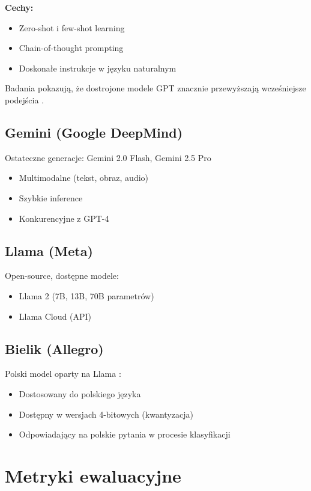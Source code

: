 \documentclass[11pt]{extreport}
\begin{document}
\textbf{Cechy:}
\begin{itemize}
    \item Zero-shot i few-shot learning
    \item Chain-of-thought prompting
    \item Doskonałe instrukcje w języku naturalnym
\end{itemize}

Badania pokazują, że dostrojone modele GPT znacznie przewyższają wcześniejsze podejścia \cite{openai2024gpt4}.

\subsection{Gemini (Google DeepMind)}

Ostateczne generacje: Gemini 2.0 Flash, Gemini 2.5 Pro
\begin{itemize}
    \item Multimodalne (tekst, obraz, audio)
    \item Szybkie inference
    \item Konkurencyjne z GPT-4
\end{itemize}

\subsection{Llama (Meta)}

Open-source, dostępne modele:
\begin{itemize}
    \item Llama 2 (7B, 13B, 70B parametrów)
    \item Llama Cloud (API) \cite{touvron2023llama}
\end{itemize}

\subsection{Bielik (Allegro)}

Polski model oparty na Llama \cite{bielik2024}:
\begin{itemize}
    \item Dostosowany do polskiego języka
    \item Dostępny w wersjach 4-bitowych (kwantyzacja)
    \item Odpowiadający na polskie pytania w procesie klasyfikacji
\end{itemize}

\section{Metryki ewaluacyjne}
\label{sec:metryki}
\end{document}
